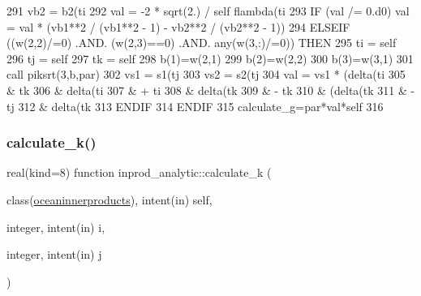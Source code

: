\begin{DoxyCode}
291         vb2 = b2(ti%
292         val = -2 * sqrt(2.) / self%
      flambda(ti%
293         \textcolor{keywordflow}{IF} (val /= 0.d0) val = val * (vb1**2 / (vb1**2 - 1) - vb2**2 / (vb2**2 - 1))
294       \textcolor{keywordflow}{ELSEIF} ((w(2,2)/=0) .AND. (w(2,3)==0) .AND. any(w(3,:)/=0)) \textcolor{keywordflow}{THEN}
295         ti = self%
296         tj = self%
297         tk = self%
298         b(1)=w(2,1)
299         b(2)=w(2,2)
300         b(3)=w(3,1)
301         \textcolor{keyword}{call }piksrt(3,b,par)
302         vs1 = s1(tj%
303         vs2 = s2(tj%
304         val = vs1 * (delta(ti%
305           & tk%
306           & delta(ti%
307           & + ti%
308           & delta(tk%
309           & - tk%
310           & (delta(tk%
311           & - tj%
312           & delta(tk%
313 \textcolor{keywordflow}{      ENDIF}
314 \textcolor{keywordflow}{    ENDIF}
315     calculate\_g=par*val*self%
316  
\end{DoxyCode}
\mbox{\label{namespaceinprod__analytic_a25c4aee768622508f24ea32ce9258618}} 
\subsubsection{\texorpdfstring{calculate\+\_\+k()}{calculate\_k()}}
{\footnotesize\ttfamily real(kind=8) function inprod\+\_\+analytic\+::calculate\+\_\+k (\begin{DoxyParamCaption}\item[{class(\hyperlink{structinprod__analytic_1_1oceaninnerproducts}{oceaninnerproducts}), intent(in)}]{self,  }\item[{integer, intent(in)}]{i,  }\item[{integer, intent(in)}]{j }\end{DoxyParamCaption})\hspace{0.3cm}{\ttfamily [private]}}



